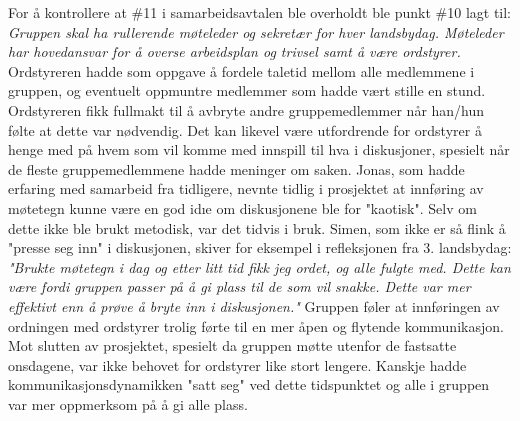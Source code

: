 For å kontrollere at \#11 i samarbeidsavtalen ble overholdt ble punkt \#10 lagt til: \textit{Gruppen skal ha rullerende møteleder og sekretær for hver landsbydag. Møteleder har hovedansvar for å overse arbeidsplan og trivsel samt å være ordstyrer.}
Ordstyreren hadde som oppgave å fordele taletid mellom alle medlemmene i gruppen, og eventuelt oppmuntre medlemmer som hadde vært stille en stund.
Ordstyreren fikk fullmakt til å avbryte andre gruppemedlemmer når han/hun følte at dette var nødvendig.
Det kan likevel være utfordrende for ordstyrer å henge med på hvem som vil komme med innspill til hva i diskusjoner, spesielt når de fleste gruppemedlemmene hadde meninger om saken.
Jonas, som hadde erfaring med samarbeid fra tidligere, nevnte tidlig i prosjektet at innføring av møtetegn kunne være en god id\i{e} om diskusjonene ble for "kaotisk".
Selv om dette ikke ble brukt metodisk, var det tidvis i bruk.
Simen, som ikke er så flink å "presse seg inn" i diskusjonen, skiver for eksempel i refleksjonen fra 3. landsbydag: \textit{"Brukte møtetegn i dag og etter litt tid fikk jeg ordet, og alle fulgte med. Dette kan være fordi gruppen passer på å gi plass til de som vil snakke. Dette var mer effektivt enn å prøve å bryte inn i diskusjonen."}
Gruppen føler at innføringen av ordningen med ordstyrer trolig førte til en mer åpen og flytende kommunikasjon.
Mot slutten av prosjektet, spesielt da gruppen møtte utenfor de fastsatte onsdagene, var ikke behovet for ordstyrer like stort lengere.
Kanskje hadde kommunikasjonsdynamikken "satt seg" ved dette tidspunktet og alle i gruppen var mer oppmerksom på å gi alle plass.
